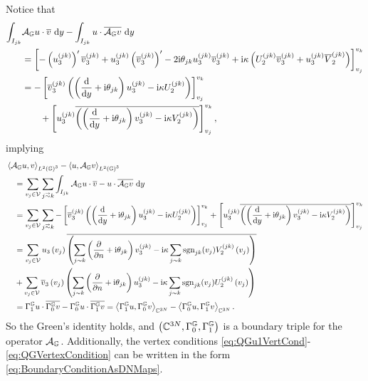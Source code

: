 Notice that
\begin{align*}
	\int_{I_{jk}} &\mathcal{A}_{\mathbb{G}} u \cdot \overline{v}  \ \mathrm{d}y - \int_{I_{jk}} u \cdot \overline{\mathcal{A}_{\mathbb{G}} v}  \ \mathrm{d}y \\
	&= \left[  -\left( u^{(jk)}_3 \right)' \overline{v}^{(jk)}_3 + u^{(jk)}_3 \left( \overline{v}^{(jk)}_3 \right)' - 2\mathrm{i}\theta_{jk}u_3^{(jk)} \overline{v}^{(jk)}_3 + \mathrm{i}\kappa\left( U_2^{(jk)} \overline{v}^{(jk)}_3 + u^{(jk)}_3 \overline{V}^{(jk)}_2 \right)  \right]_{v_j}^{v_k} \\
	&= -\left[  \overline{v}^{(jk)}_3\left(  \left( \dfrac{\mathrm{d}}{\mathrm{d}y} + \mathrm{i}\theta_{jk}  \right)u^{(jk)}_3 - \mathrm{i}\kappa U^{(jk)}_2  \right)  \right]_{v_j}^{v_k} \\
	&\qquad + \left[  u^{(jk)}_3\overline{\left(  \left( \dfrac{\mathrm{d}}{\mathrm{d}y} + \mathrm{i}\theta_{jk}  \right)v^{(jk)}_3 - \mathrm{i}\kappa V^{(jk)}_2  \right)}  \right]_{v_j}^{v_k},
\end{align*}
implying
\begin{align*}
	&\ip{\ag u}{v}_{L^2\bracs{\graph}^3} - \ip{u}{\ag v}_{L^2\bracs{\graph}^3} \\
	&\quad = \sum_{v_j\in\vertSet}\sum_{j\conLeft k} \integral{I_{jk}}{ \ag u \cdot \overline{v} - u \cdot \overline{\ag v} }{y} \\
	&\quad = \sum_{v_j\in\vertSet}\sum_{j\conLeft k} -\sqbracs{ \overline{v}_3^{(jk)}\bracs{ \bracs{\diff{}{y} + \rmi\qm_{jk} }u_3^{(jk)} - \rmi\wavenumber U_2^{(jk)} } }_{v_j}^{v_k}
	+ \sqbracs{ u_3^{(jk)}\overline{\bracs{ \bracs{\diff{}{y} + \rmi\qm_{jk} }v_3^{(jk)} - \rmi\wavenumber V_2^{(jk)} }} }_{v_j}^{v_k} \\
	&\quad = \sum_{v_j\in\vertSet} u_3\bracs{v_j}\overline{\bracs{ \sum_{j\con k}\bracs{\pdiff{}{n} + \rmi\qm_{jk}}v_3^{(jk)} - \rmi\wavenumber\sum_{j\con k} \sgn_{jk}(v_j) V_2^{(jk)}\bracs{v_j} }} \\
	&\quad + \sum_{v_j\in\vertSet} \overline{v}_3\bracs{v_j}\bracs{ \sum_{j\con k}\bracs{\pdiff{}{n} + \rmi\qm_{jk}}u_3^{(jk)} - \rmi\wavenumber\sum_{j\con k} \sgn_{jk}(v_j) U_2^{(jk)}\bracs{v_j} } \\
	&\quad = \ngmap u \cdot \overline{\dgmap v} - \dgmap u \cdot \overline{\ngmap v}
	= \ip{\ngmap u}{\dgmap v}_{\complex^{3N}} - \ip{\dgmap u}{\ngmap v}_{\complex^{3N}}.
\end{align*}
So the Green's identity holds, and $\left( \mathbb{C}^{3N}, \Gamma_0^{\mathbb{G}}, \Gamma_1^{\mathbb{G}} \right)$ is a boundary triple for the operator $\mathcal{A}_{\mathbb{G}}$.
Additionally, the vertex conditions \eqref{eq:QGu1VertCond}-\eqref{eq:QGVertexCondition} can be written in the form \eqref{eq:BoundaryConditionAsDNMaps}.

